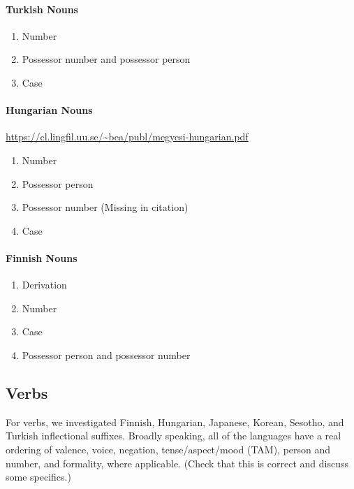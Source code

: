 \documentclass[11pt,letterpaper]{article}
\newcommand\becky[1]{{\color{blue}(#1)}}
\begin{document}
\paragraph{Turkish Nouns}
\begin{enumerate}
    \item Number
    \item Possessor number and possessor person
    \item Case 
\end{enumerate}

\paragraph{Hungarian Nouns}
\url{https://cl.lingfil.uu.se/~bea/publ/megyesi-hungarian.pdf}
\begin{enumerate}
    \item Number
    \item Possessor person
    \item Possessor number \becky{Missing in citation}
    \item Case 
\end{enumerate}

\paragraph{Finnish Nouns}
\begin{enumerate}
    \item Derivation
    \item Number
    \item Case 
    \item Possessor person and possessor number
\end{enumerate}

\subsection{Verbs}
For verbs, we investigated Finnish, Hungarian, Japanese, Korean, Sesotho, and Turkish inflectional suffixes. Broadly speaking, all of the languages have a real ordering of valence, voice, negation, tense/aspect/mood (TAM), person and number, and formality, where applicable. \becky{Check that this is correct and discuss some specifics.} 
\end{document}
